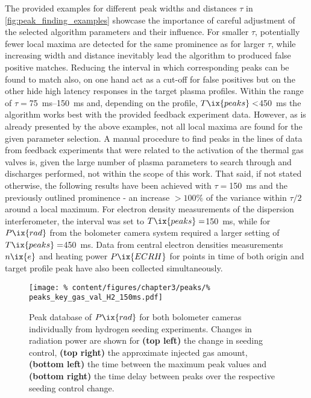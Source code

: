         The provided examples for different peak widths and distances $\tau$ in \cref{fig:peak_finding_examples} showcase the importance of careful adjustment of the selected algorithm parameters and their influence. For smaller $\tau$, potentially fewer local maxima are detected for the same prominence as for larger $\tau$, while increasing width and distance inevitably lead the algorithm to produced false positive matches. Reducing the interval in which corresponding peaks can be found to match also, on one hand act as a cut-off for false positives but on the other hide high latency responses in the target plasma profiles. Within the range of $\tau=$\SIrange{75}{150}{\milli\second} and, depending on the profile, $T\ix{peaks}<$\SI{450}{\milli\second} the algorithm works best with the provided feedback experiment data. However, as is already presented by the above examples, not all local maxima are found for the given parameter selection. A manual procedure to find peaks in the lines of data from feedback experiments that were related to the activation of the thermal gas valves is, given the large number of plasma parameters to search through and discharges performed, not within the scope of this work. That said, if not stated otherwise, the following results have been achieved with $\tau=$\SI{150}{\milli\second} and the previously outlined prominence - an increase $>100\%$ of the variance within $\tau/2$ around a local maximum. For electron density measurements of the dispersion interferometer, the interval was set to $T\ix{peaks}=$\SI{150}{\milli\second}, while for $P\ix{rad}$ from the bolometer camera system required a larger setting of $T\ix{peaks}=$\SI{450}{\milli\second}. Data from central electron densities measurements $n\ix{e}$ and heating power $P\ix{ECRH}$ for points in time of both origin and target profile peak have also been collected simultaneously.\\%
%
        \begin{figure}[t]%
            \centering%
            \texttt{[image: \%
                content/figures/chapter3/peaks/\%
                peaks\_key\_gas\_val\_H2\_150ms.pdf]}%
            \caption{Peak database of $P\ix{rad}$ for both bolometer cameras individually from hydrogen seeding experiments. Changes in radiation power are shown for \textbf{(top left)} the change in seeding control, \textbf{(top right)} the approximate injected gas amount, \textbf{(bottom left)} the time between the maximum peak values and \textbf{(bottom right)} the time delay between peaks over the respective seeding control change.}\label{fig:peak_database_H2}%
        \end{figure}%
